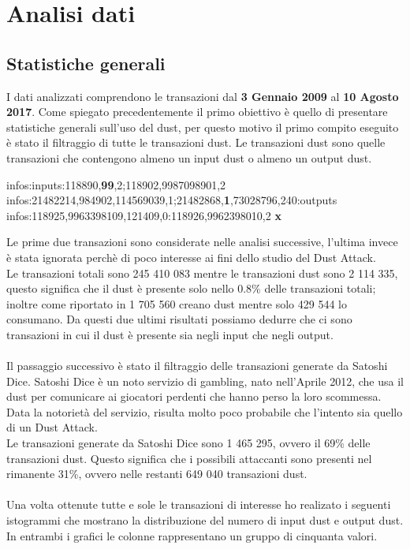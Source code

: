 \chapter{Analisi dati}
\section{Statistiche generali}
I dati analizzati comprendono le transazioni dal \textbf{3 Gennaio 2009} al \textbf{10 Agosto 2017}.
Come spiegato precedentemente il primo obiettivo è quello di presentare statistiche generali sull'uso del dust, per questo motivo il primo compito eseguito è stato il filtraggio di tutte le transazioni dust. Le transazioni dust sono quelle transazioni che contengono almeno un input dust o almeno un output dust.
\begin{mdframed}
 infos:inputs:118890,\textbf{99},2;118902,9987098901,2 \checkmark\\
 infos:21482214,984902,114569039,1;21482868,\textbf{1},73028796,240:outputs \checkmark\\
 infos:118925,9963398109,121409,0:118926,9962398010,2 \textbf{x}
\end{mdframed}
Le prime due transazioni sono considerate nelle analisi successive, l'ultima invece è stata ignorata perchè di poco interesse ai fini dello studio del Dust Attack.\\
Le transazioni totali sono 245 410 083 mentre le transazioni dust sono 2 114 335, questo significa che il dust è presente solo nello 0.8\% delle transazioni totali; inoltre come riportato in \cite{dustAnalisi} 1 705 560 creano dust mentre solo 429 544 lo consumano. Da questi due ultimi risultati possiamo dedurre che ci sono transazioni in cui il dust è presente sia negli input che negli output.\\\\
Il passaggio successivo è stato il filtraggio delle transazioni generate da Satoshi Dice. Satoshi Dice \cite{SD} è un noto servizio di gambling, nato nell'Aprile 2012, che usa il dust per comunicare ai giocatori perdenti che hanno perso la loro scommessa. Data la notorietà del servizio, risulta molto poco probabile che l'intento sia quello di un Dust Attack.\\
Le transazioni generate da Satoshi Dice sono 1 465 295, ovvero il 69\% delle transazioni dust. Questo significa che i possibili attaccanti sono presenti nel rimanente 31\%, ovvero nelle restanti 649 040 transazioni dust.\\\\
Una volta ottenute tutte e sole le transazioni di interesse ho realizato i seguenti istogrammi che mostrano la distribuzione del numero di input dust e output dust. In entrambi i grafici le colonne rappresentano un gruppo di cinquanta valori.
